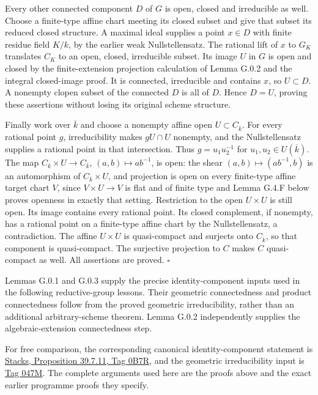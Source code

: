 \documentclass[11pt,a4paper,openany]{report}
\newcounter{none}
\begin{document}
Every other connected component \(D\) of \(G\) is open, closed and irreducible as well. Choose a finite-type affine chart meeting its closed subset and give that subset its reduced closed structure. A maximal ideal supplies a point \(x\in D\) with finite residue field \(K/k\), by the earlier weak Nullstellensatz. The rational lift of \(x\) to \(G_K\) translates \(C_K\) to an open, closed, irreducible subset. Its image \(U\) in \(G\) is open and closed by the finite-extension projection calculation of Lemma G.0.2 and the integral closed-image proof. It is connected, irreducible and contains \(x\), so \(U\subset D\). A nonempty clopen subset of the connected \(D\) is all of \(D\). Hence \(D=U\), proving these assertions without losing its original scheme structure.

Finally work over \(\overline k\) and choose a nonempty affine open \(U\subset C_{\overline k}\). For every rational point \(g\), irreducibility makes \(gU\cap U\) nonempty, and the Nullstellensatz supplies a rational point in that intersection. Thus \(g=u_1u_2^{-1}\) for \(u_1,u_2\in U(\overline k)\). The map \(C_{\overline k}\times U\to C_{\overline k}\), \((a,b)\mapsto ab^{-1}\), is open: the shear \((a,b)\mapsto(ab^{-1},b)\) is an automorphism of \(C_{\overline k}\times U\), and projection is open on every finite-type affine target chart \(V\), since \(V\times U\to V\) is flat and of finite type and Lemma G.4.F below proves openness in exactly that setting. Restriction to the open \(U\times U\) is still open. Its image contains every rational point. Its closed complement, if nonempty, has a rational point on a finite-type affine chart by the Nullstellensatz, a contradiction. The affine \(U\times U\) is quasi-compact and surjects onto \(C_{\overline k}\), so that component is quasi-compact. The surjective projection to \(C\) makes \(C\) quasi-compact as well. All assertions are proved. \(\square\)

Lemmas G.0.1 and G.0.3 supply the precise identity-component inputs used in the following reductive-group lessons. Their geometric connectedness and product connectedness follow from the proved geometric irreducibility, rather than an additional arbitrary-scheme theorem. Lemma G.0.2 independently supplies the algebraic-extension connectedness step.

For free comparison, the corresponding canonical identity-component statement is \href{https://stacks.math.columbia.edu/tag/0B7R}{Stacks, Proposition 39.7.11, Tag 0B7R}, and the geometric irreducibility input is \href{https://stacks.math.columbia.edu/tag/047M}{Tag 047M}. The complete arguments used here are the proofs above and the exact earlier programme proofs they specify.
\end{document}
